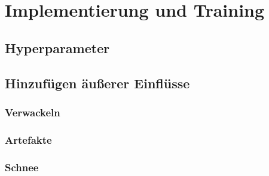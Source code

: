 \chapter{Implementierung und Training}
\section{Hyperparameter}

\section{Hinzufügen äußerer Einflüsse}
\subsection{Verwackeln}
\subsection{Artefakte}
\subsection{Schnee}
